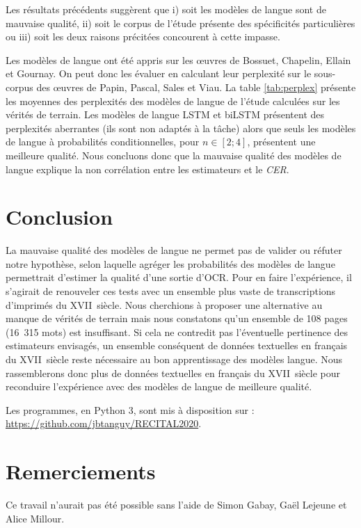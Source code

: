 \documentclass[10pt,twoside]{article}
\begin{document}
    Les résultats précédents suggèrent que i) soit les modèles de langue sont de mauvaise qualité, ii) soit le corpus de l'étude présente des spécificités particulières 
    ou iii) soit les deux raisons précitées concourent à cette impasse.

    Les modèles de langue ont été appris sur les \oe{}uvres de Bossuet, Chapelin, Ellain et Gournay. On peut donc les
    évaluer en calculant leur perplexité sur le sous-corpus des \oe{}uvres de Papin, Pascal, Sales et Viau. 
    La table \ref{tab:perplex} présente les moyennes des perplexités des modèles de langue
    de l'étude calculées sur les vérités de terrain. Les modèles de langue LSTM et biLSTM 
    présentent des perplexités aberrantes (ils sont non adaptés à la tâche) alors que seuls les modèles de langue à probabilités conditionnelles, pour $n \in \left[2;4\right]$,
    présentent une meilleure qualité. Nous concluons donc que la mauvaise qualité des modèles de langue
    explique la non corrélation entre les estimateurs et le \textit{CER}.



    


\section{Conclusion}
La mauvaise qualité des modèles de langue ne permet pas de valider ou réfuter notre hypothèse, selon laquelle agréger les 
probabilités des modèles de langue permettrait d'estimer la qualité d'une sortie d'OCR. Pour en faire l'expérience, il s'agirait 
de renouveler ces tests avec un ensemble plus vaste de transcriptions d'imprimés du XVII\ieme~siècle. Nous cherchions à proposer une 
alternative au manque de vérités de terrain mais nous constatons qu'un ensemble de 108 pages (16~315 mots) est insuffisant. 
Si cela ne contredit pas l'éventuelle pertinence des estimateurs envisagés, un ensemble conséquent de données textuelles en français du 
XVII\ieme~siècle reste nécessaire au bon apprentissage des modèles langue. Nous rassemblerons donc plus de données textuelles en 
français du XVII\ieme~siècle pour reconduire l'expérience avec des modèles de langue de meilleure qualité. 


Les programmes, en Python 3, sont mis à disposition sur : \url{https://github.com/jbtanguy/RECITAL2020}.

\section*{Remerciements}
Ce travail n'aurait pas été possible sans l'aide de Simon Gabay, Gaël Lejeune et Alice Millour.  



\nocite{Wick2018a, Springmann2016b, BergKirkpatrick2014a,Breuel2013a,Vamvakas2008a}



\end{document}
